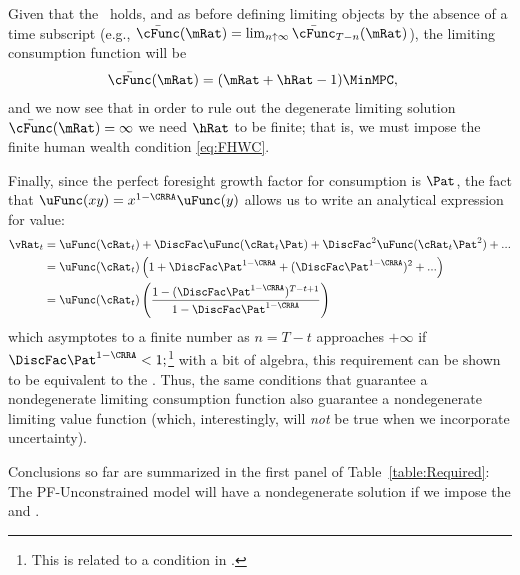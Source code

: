 \documentclass[BufferStockTheory]{subfiles}
\begin{document}
Given that the {\RIC}~holds, and as before defining limiting objects by the absence of a time subscript (e.g., $\bar{\cFunc}(\mRat)=\lim_{n \uparrow \infty} \bar{\cFunc}_{T-n}(\mRat)$), the limiting consumption function will be
\begin{align}\label{eq:cFuncPFUnc}
  \bar{\cFunc}(\mRat)  & = (\mRat+\hRat-1)\MinMPC, 
\end{align}
and we now see that in order to rule out the degenerate limiting
solution $\bar{\cFunc}(\mRat) = \infty$ we need $\hRat$ to be finite; that is, we
must impose the finite human wealth condition \eqref{eq:FHWC}.

\hypertarget{ValuePFAnalytical}{}
Finally, since the perfect foresight
growth factor for consumption is $\Pat$, the fact that $\uFunc(xy) =
x^{1-\CRRA}\uFunc(y)$ allows us to write an analytical expression for value:  
\begin{align}
  \vRat_{t}  & = \uFunc(\cRat_{t})+\DiscFac \uFunc(\cRat_{t}\Pat)+\DiscFac^{2} \uFunc(\cRat_{t} \Pat^{2})+... \label{eq:ValuePFAnalytical}
  \\  & = \uFunc(\cRat_{t})\left(1+\DiscFac \Pat^{1-\CRRA}+(\DiscFac \Pat^{1-\CRRA})^{2}+...\right) \notag 
  \\  & = \uFunc(\cRat_{t})\left(\frac{1-(\DiscFac \Pat^{1-\CRRA})^{T-t+1}}{1-\DiscFac \Pat^{1-\CRRA}}\right) \notag
\end{align}
which asymptotes to a finite number as $n=T-t$ approaches $+\infty$ if $\DiscFac \Pat^{1-\CRRA} < 1;$\footnote{This is related to a condition in \cite{asHomogeneous}.} with a bit of algebra,
this requirement can be shown to be equivalent to the {\RIC}.  Thus, the same conditions that guarantee a nondegenerate limiting consumption function also guarantee a nondegenerate limiting value function (which, interestingly, will \textit{not} be true when we incorporate uncertainty).

Conclusions so far are summarized in the first panel of Table~\ref{table:Required}:  The PF-Unconstrained model will have a nondegenerate solution if we impose the {\RIC} and {\FHWC}.

\hypertarget{PF-Constrained-Solution}{}
\hypertarget{Constrained-Solution}{}
\end{document}
